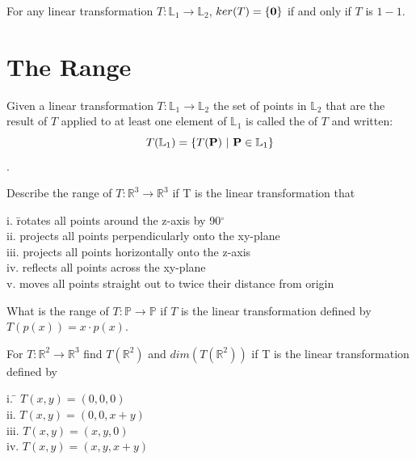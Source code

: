 \begin{theorem}
	For any linear transformation $T:\mathbb{L}_1 \longrightarrow \mathbb{L}_2 $, $ker(T) = \{\textbf{0}\}$ if and only if $T$  is $1-1$. 
\end{theorem}

\vspace{.5cm}

\section{The Range}    \label{The Range}

\begin{defn}
	Given a linear transformation $T:\mathbb{L}_1 \longrightarrow \mathbb{L}_2 $ the set of points in $\mathbb{L}_2$ that are the result of $T$ applied to at least one element of $\mathbb{L}_1$ is called the  of $T$ and written:
	\[T(\mathbb{L}_1)= \{ T(\textbf{P}) \  |\ \textbf{P} \in \mathbb{L}_1  \}  \]. 
\end{defn}

\begin{myexa}[\bd{a}]
	Describe the range of $T:\mathbb{R}^3 \longrightarrow \mathbb{R}^3$ if T is the linear transformation that 
	\begin{tabbing} 
		\indent i. \quad  \= rotates all points around the z-axis by 90$^\circ$ \\
		\indent ii. \> projects all points perpendicularly onto the xy-plane \\
		\indent iii.  \> projects all points horizontally onto the z-axis\\
		\indent iv.  \> reflects all points across the xy-plane \\
		\indent v.   \> moves all points straight out to twice their distance from origin
	\end{tabbing}  
\end{myexa} 

\begin{myexb}[\bd{b}]
		What is the range of $T:\mathbb{P} \longrightarrow \mathbb{P}$ if $T$ is the linear transformation defined by $T(p(x)) = x\cdot p(x)$. 
\end{myexb}

\begin{myexc}[\bd{c}]
For $T:\mathbb{R}^2 \longrightarrow \mathbb{R}^3$ find $T(\mathbb{R}^2)$ and $dim(T(\mathbb{R}^2))$ if T is the linear transformation defined by 
\begin{tabbing} 
	\indent i. \quad  \= $T(x,y) = (0, 0, 0)$ \\
	\indent ii. \> $T(x,y) = (0, 0 ,x+y)$ \\
	\indent iii.  \> $T(x,y) = (x,y,0)$ \\
	\indent iv.  \> $T(x,y) = (x, y, x+y)$ 
\end{tabbing}  
\end{myexc}

